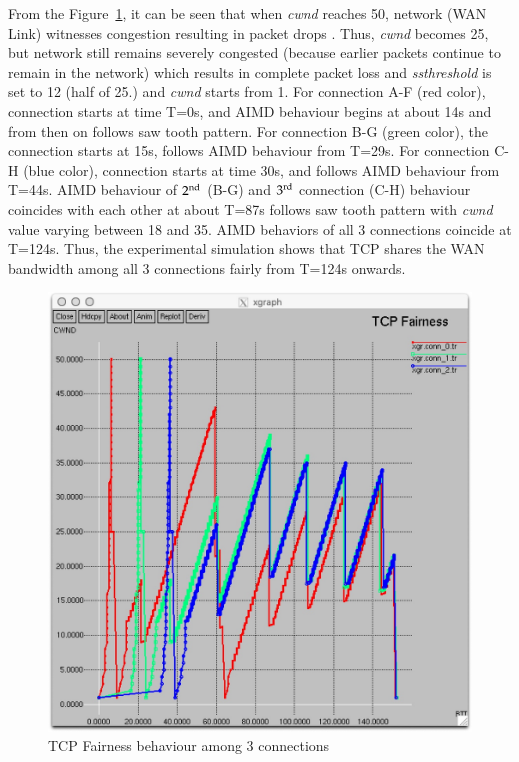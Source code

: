 \begin{multicols}{2}
From the Figure~\ref{chap2-fig08}, it can be seen that when \textit{cwnd} reaches 50, network (WAN Link) witnesses congestion resulting in packet drops . Thus, \textit{cwnd} becomes 25, but network still remains severely congested (because earlier packets continue to remain in the network) which results in complete packet loss and \textit{ssthreshold} is set to 12 (half of 25.) and \textit{cwnd} starts from 1. For connection A-F (red color), connection starts at time T=0s, and AIMD behaviour begins at about 14s and from then on follows saw tooth pattern. For connection B-G (green color), the connection starts at 15s, follows AIMD behaviour from T=29s. For connection C-H (blue color), connection starts at time 30s, and follows AIMD behaviour from T=44s. AIMD behaviour of ${\rm 2}^{\text{nd}}$ (B-G) and ${\rm 3}^{\text{rd}}$ connection (C-H) behaviour coincides with each other at about T=87s follows saw tooth pattern with \textit{cwnd} value varying between 18 and 35. AIMD behaviors of all 3 connections coincide at T=124s. Thus, the experimental simulation shows that TCP shares the WAN bandwidth among all 3 connections fairly from T=124s onwards.

\begin{figure}[H]
\centering
\includegraphics[scale=.85]{src/Figures/chap2/chap2-fig08.jpg}
\caption{TCP Fairness behaviour among 3 connections}\label{chap2-fig08}
\end{figure}


\end{multicols}
